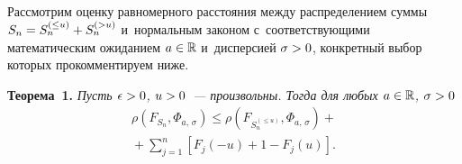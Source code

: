 \begin{multicols}{2}
Рассмотрим оценку равномерного расстояния между распределением суммы $S_n\hm=S_n^{(\le u)}
\hm+S_n^{(>u)}$ и~нормальным законом с~соответствующими математическим ожиданием 
$a\hm\in\mathbb{R}$ и~дисперсией $\sigma\hm>0$, конкретный выбор которых прокомментируем \mbox{ниже}.

\smallskip

\noindent
\textbf{Теорема~1.} \textit{ Пусть $\epsilon\hm>0$, $u\hm>0$~--- произвольны. 
Тогда для любых $a\hm\in\mathbb{R}$, $\sigma\hm>0$}
\begin{multline}
\rho\left(F_{S_n},\Phi_{a,\,\sigma}\right)\le
\rho\left(F_{S_n^{(\le u)}},\Phi_{a,\,\sigma}\right)+{}\\
{}+
\sum\limits_{j=1}^n\left[F_j(-u)+1-F_j(u)\right].
\label{e1-dor}
\end{multline}

\smallskip


\end{multicols}
